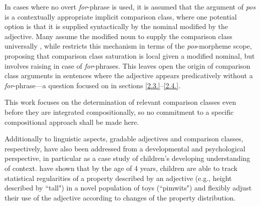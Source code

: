 In cases where no overt \textit{for}-phrase is used, it is assumed that the argument of \textit{pos} is a contextually appropriate implicit comparison class, where one potential option is that it is supplied syntactically by the nominal modified by the adjective. Many assume the modified noun to supply the comparison class universally \parencite[cf.~e.g.][]{Cresswell1976, Kamp1975, Heim2000}, while \textcite{Solt2009} restricts this mechanism in terms of the \textit{pos}-morpheme scope, proposing that comparison class saturation is local given a modified nominal, but involves raising in case of \textit{for}-phrases. This leaves open the origin of comparison class arguments in sentences where the adjective appears predicatively without a \textit{for}-phrase---a question focused on in sections \ref{2.3.}--\ref{2.4.}. 

This work focuses on the determination of relevant comparison classes even before they are integrated compositionally, so no commitment to a specific compositional approach shall be made here. %

Additionally to linguistic aspects, gradable adjectives and comparison classes, respectively, have also been addressed from a developmental and psychological perspective, in particular as a case study of children's developing understanding of context. 
\textcite{barner2008} have shown that by the age of 4 years, children are able to track statistical regularities of a property described by an adjective (e.g., height described by ``tall") in a novel population of toys (``pimwits") and flexibly adjust their use of the adjective according to changes of the property distribution. 
 
